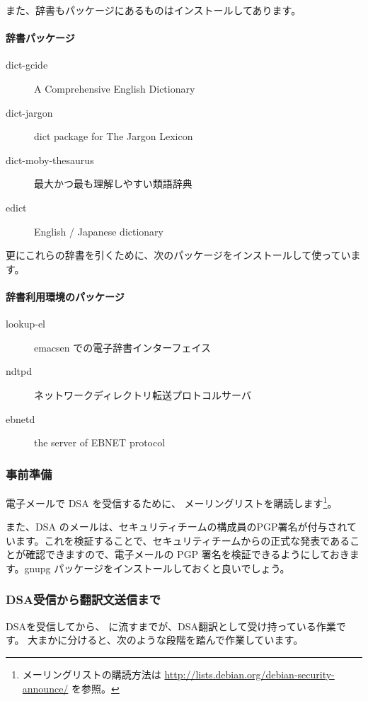 \documentclass[mingoth,a4paper]{jsarticle}
\begin{document}
また、辞書もパッケージにあるものはインストールしてあります。

\paragraph{辞書パッケージ}
\begin{description}
\item[dict-gcide] A Comprehensive English Dictionary
\item[dict-jargon] dict package for The Jargon Lexicon
\item[dict-moby-thesaurus] 最大かつ最も理解しやすい類語辞典
\item[edict] English / Japanese dictionary
\end{description}

更にこれらの辞書を引くために、次のパッケージをインストールして使っています。
\paragraph{辞書利用環境のパッケージ}
\begin{description}
\item[lookup-el] emacsen での電子辞書インターフェイス
\item[ndtpd] ネットワークディレクトリ転送プロトコルサーバ
\item[ebnetd] the server of EBNET protocol
\end{description}


\subsubsection{事前準備}

電子メールで DSA を受信するために、 メーリングリストを購読します\footnote{メーリングリストの購読方法は \url{http://lists.debian.org/debian-security-announce/} を参照。}。

また、DSA のメールは、セキュリティチームの構成員のPGP署名が付与されています。これを検証することで、セキュリティチームからの正式な発表であることが確認できますので、電子メールの PGP 署名を検証できるようにしておきます。gnupg パッケージをインストールしておくと良いでしょう。



\subsubsection{DSA受信から翻訳文送信まで}

DSAを受信してから、  に流すまでが、DSA翻訳として受け持っている作業です。
大まかに分けると、次のような段階を踏んで作業しています。
\end{document}
